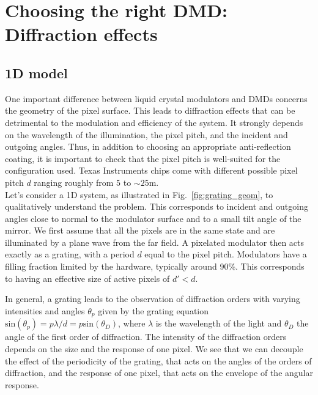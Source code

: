 \documentclass[12pt]{iopart}
\begin{document}



\section{Choosing the right DMD: Diffraction effects}

\subsection{1D model}

One important difference between liquid crystal modulators and DMDs 
concerns the geometry of the pixel surface. 
This leads to diffraction effects that can be detrimental 
to the modulation and efficiency of the system.
It strongly depends on the wavelength of the illumination, 
the pixel pitch, and the incident and outgoing angles. 
Thus, in addition to choosing an appropriate anti-reflection coating, 
it is important to check that the pixel pitch is well-suited for the configuration used.
Texas Instruments chips come with different possible pixel pitch $d$ 
ranging roughly from $5$ to $\sim25$\textmu m\cite{TI}.\\


Let's consider a 1D system,
as illustrated in Fig.~\ref{fig:grating_geom},  
to qualitatively understand the problem.
This corresponds to incident and outgoing angles close to normal to the modulator surface 
and to a small tilt angle of the mirror. 
We first assume that all the pixels are in the same state 
and are illuminated by a plane wave from the far field.
A pixelated modulator then acts exactly as a grating, 
with a period $d$ equal to the pixel pitch.
Modulators have a filling fraction limited by the hardware, 
typically around 90\%.
This corresponds to having an effective size of active pixels of $d' < d$.

In general, a grating leads to the observation of diffraction orders  
with varying intensities 
and angles $\theta_p$ given by the grating equation
$\text{sin}(\theta_p) = p\lambda/d = p \text{sin}(\theta_D)$,
where $\lambda$ is the wavelength of the light 
and $\theta_D$ the angle of the first order of diffraction.
The intensity of the diffraction orders depends on the size and the response of one pixel.
We see that we can decouple the effect of the periodicity of the grating, 
that acts on the angles of the orders of diffraction, 
and the response of one pixel, 
that acts on the envelope of the angular response.
\end{document}
